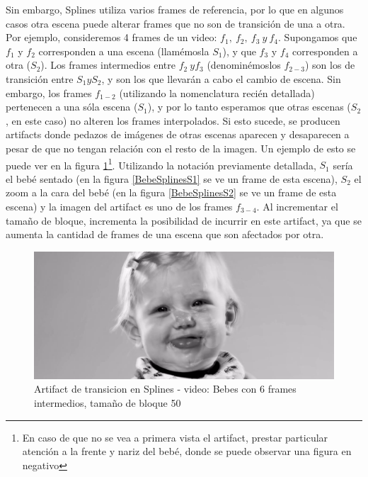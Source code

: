 \par Sin embargo, Splines utiliza varios frames de referencia, por lo que en algunos casos otra escena puede alterar frames que no son de transici\'on de una a otra.
Por ejemplo, consideremos 4 frames de un video: $f_1,\ f_2,\ f_3\ y\ f_4$.
Supongamos que $f_1$ y $f_2$ corresponden a una escena (llam\'emosla $S_1$), y que $f_3$ y $f_4$ corresponden a otra ($S_2$).
Los frames intermedios entre $f_2\ y f_3$ (denomin\'emoslos $f_{2-3}$) son los de transici\'on entre $S_1 y S_2$, y son los que llevar\'an a cabo el cambio de escena.
Sin embargo, los frames $f_{1-2}$ (utilizando la nomenclatura reci\'en detallada) pertenecen a una s\'ola escena ($S_1$), y por lo tanto esperamos que otras escenas ($S_2$, en este caso) no alteren los frames interpolados.
Si esto sucede, se producen artifacts donde pedazos de im\'agenes de otras escenas aparecen y desaparecen a pesar de que no tengan relaci\'on con el resto de la imagen.
Un ejemplo de esto se puede ver en la figura \ref{BebesSplinesArtifact}\footnote{En caso de que no se vea a primera vista el artifact, prestar particular atenci\'on a la frente y nariz del beb\'e, donde se puede observar una figura en negativo}.
Utilizando la notaci\'on previamente detallada, $S_1$ ser\'ia el beb\'e sentado (en la figura \ref{BebeSplinesS1} se ve un frame de esta escena), $S_2$ el zoom a la cara del beb\'e (en la figura \ref{BebeSplinesS2} se ve un frame de esta escena) y la imagen del artifact es uno de los frames $f_{3-4}$.
Al incrementar el tama\~no de bloque, incrementa la posibilidad de incurrir en este artifact, ya que se aumenta la cantidad de frames de una escena que son afectados por otra.

\FloatBarrier
\begin{figure}[h]
\caption{Artifact de transicion en Splines - video: Bebes con 6 frames intermedios, tama\~no de bloque 50}
\label{BebesSplinesArtifact}
\includegraphics[width=0.9\columnwidth]{imagenes/cualitativos/BSA.png}
\end{figure}
\FloatBarrier

